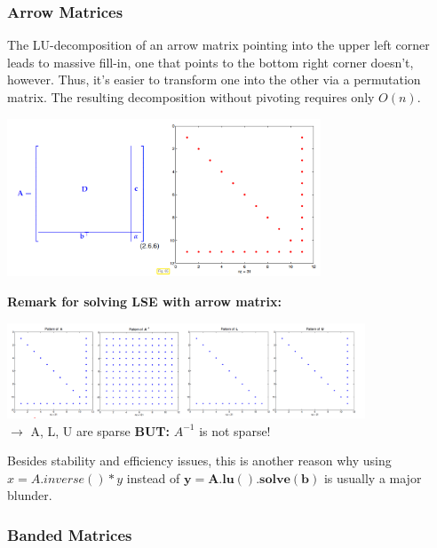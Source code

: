 \documentclass[12pt, a4paper]{article}
\begin{document}
\subsubsection{Arrow Matrices}

The LU-decomposition of an arrow matrix pointing into the upper left corner leads to massive fill-in, one that points to the bottom right corner doesn't, however. Thus, it's easier to transform one into the other via a permutation matrix. The resulting decomposition without pivoting requires only $O(n)$.

\begin{center}
	\includegraphics[width=0.7\textwidth]{arrow_matrix.png}
\end{center}

\begin{tcolorbox}
	\vspace{1mm}
	\textbf{Remark for solving LSE with arrow matrix:}
	\begin{center}
		\includegraphics[width=0.8\textwidth]{arrow_matrix_inverse.png} \\
		$\rightarrow$ A, L, U are sparse \quad \quad \textbf{BUT:} $A^{-1}$ is not sparse! \\
	\end{center}

	Besides stability and efficiency issues, this is another reason why using \color{red} \\
	$x = A.inverse()*y$ \color{black} instead of \color{blue}$\mathbf{y=A.lu().solve(b)}$ \color{black} is usually a major blunder. 
\end{tcolorbox}


\subsubsection{Banded Matrices}
\end{document}
